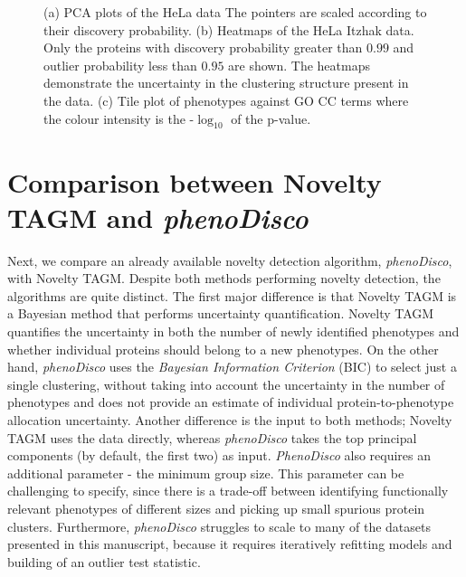 \documentclass[12pt,english]{article}
\begin{document}
\begin{figure}
\begin{subfigure}[t]{\textwidth}
	\caption{}
\end{subfigure}
	\caption{(a) PCA plots of the HeLa data The pointers are scaled according to their discovery probability. (b) Heatmaps of the HeLa Itzhak data. Only the proteins with discovery probability greater than $0.99$ and outlier probability less than $0.95$ are shown. The heatmaps demonstrate the uncertainty in the clustering structure present in the data. (c) Tile plot of phenotypes against GO CC terms where the colour intensity is the -$\log_{10}$ of the p-value.}
	\label{figure:DOM}
\end{figure}
\clearpage
\section{Comparison between Novelty TAGM and \textit{phenoDisco}}
Next, we compare an already available novelty detection algorithm, \textit{phenoDisco}, with Novelty TAGM. Despite both methods performing novelty detection, the algorithms
are quite distinct. The first major difference is that Novelty TAGM is a Bayesian 
method that performs uncertainty quantification. Novelty TAGM quantifies the uncertainty in both the number of newly identified phenotypes and whether individual proteins should belong to a new phenotypes. On the other hand, \textit{phenoDisco} uses the \textit{Bayesian Information Criterion} (BIC) to select just a single clustering, without taking into account the uncertainty in the number of phenotypes and does not provide an estimate of individual protein-to-phenotype allocation uncertainty. Another difference is the input to both methods; Novelty TAGM uses the data directly, whereas \textit{phenoDisco} takes the top principal components (by default, the first two) as input. \textit{PhenoDisco} also requires an additional parameter - the minimum group size. This parameter can be challenging to specify, since there is a trade-off between identifying functionally relevant phenotypes of different sizes and picking up small spurious protein clusters. Furthermore, \textit{phenoDisco} struggles to scale to many of the datasets presented in this manuscript, because it requires iteratively refitting models and building of an outlier test statistic. 
\end{document}
